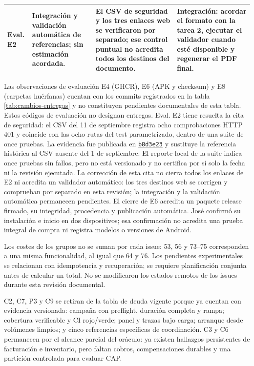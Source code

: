 \documentclass[12pt,a4paper]{article}
\begin{document}
{\begin{longtable}{>{\raggedright\arraybackslash}p{1.7cm}>{\raggedright\arraybackslash}p{3.6cm}>{\raggedright\arraybackslash}p{4.8cm}>{\raggedright\arraybackslash}p{4.3cm}}
Eval. E2 & Integración y validación automática de referencias; sin estimación acordada. & El CSV de seguridad y los tres enlaces web se verificaron por separado; ese control puntual no acredita todos los destinos del documento. & Integración: acordar el formato con la tarea 2, ejecutar el validador cuando esté disponible y regenerar el PDF final.\\
\bottomrule\end{longtable}}

Las observaciones de evaluación E4 (GHCR), E6 (APK y checksum) y E8 (carpetas huérfanas) cuentan con los commits registrados en la tabla \ref{tab:cambios-entregas} y no constituyen pendientes documentales de esta tabla. Estos códigos de evaluación no designan entregas. Eval. E2 tiene resuelta la cita de seguridad: el CSV del 11 de septiembre registra ocho comprobaciones HTTP 401 y coincide con las ocho rutas del test parametrizado, dentro de una suite de once pruebas. La evidencia fue publicada en \href{https://github.com/JoseLozanoMorales/TiendaTech/commit/b8d3e23988bf32e739f260e21cb8b999f362e783}{\texttt{b8d3e23}} y sustituye la referencia histórica al CSV ausente del 1 de septiembre. El reporte local de la suite indica once pruebas sin fallos, pero no está versionado y no certifica por sí solo la fecha ni la revisión ejecutada. La corrección de esta cita no cierra todos los enlaces de E2 ni acredita un validador automático: los tres destinos web se corrigen y comprueban por separado en esta revisión; la integración y la validación automática permanecen pendientes. El cierre de E6 acredita un paquete release firmado, su integridad, procedencia y publicación automática. José confirmó su instalación e inicio en dos dispositivos; esa confirmación no acredita una prueba integral de compra ni registra modelos o versiones de Android.

Los costes de los grupos no se suman por cada issue: 53, 56 y 73--75 corresponden a una misma funcionalidad, al igual que 64 y 76. Los pendientes experimentales se relacionan con idempotencia y recuperación; se requiere planificación conjunta antes de calcular un total. No se modificaron los estados remotos de los issues durante esta revisión documental.

C2, C7, P3 y C9 se retiran de la tabla de deuda vigente porque ya cuentan con evidencia versionada: campaña con preflight, duración completa y rampa; cobertura verificable y CI rojo/verde; panel y trazas bajo carga; arranque desde volúmenes limpios; y cinco referencias específicas de coordinación. C3 y C6 permanecen por el alcance parcial del oráculo: ya existen hallazgos persistentes de facturación e inventario, pero faltan cobros, compensaciones durables y una partición controlada para evaluar CAP.
\end{document}
